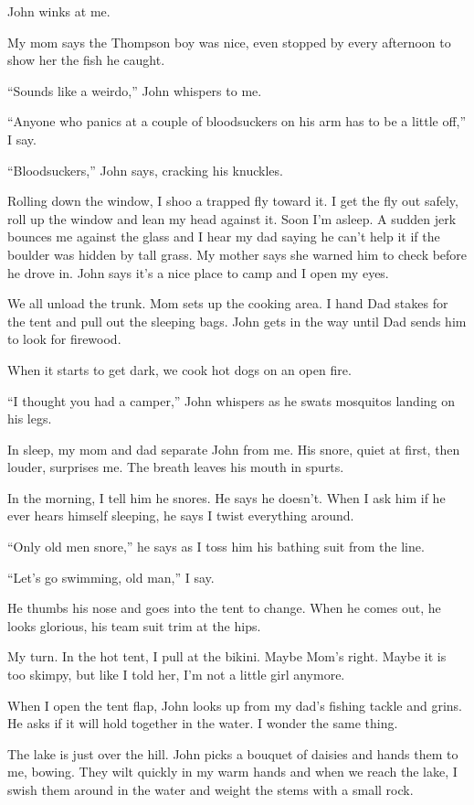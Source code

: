 \documentclass[
]{article}
\begin{document}
John winks at me.

My mom says the Thompson boy was nice, even stopped by every afternoon
to show her the fish he caught.

``Sounds like a weirdo,'' John whispers to me.

``Anyone who panics at a couple of bloodsuckers on his arm has to be a
little off,'' I say.

``Bloodsuckers,'' John says, cracking his knuckles.

Rolling down the window, I shoo a trapped fly toward it. I get the fly
out safely, roll up the win­dow and lean my head against it. Soon I'm
asleep. A sudden jerk bounces me against the glass and I hear my dad
saying he can't help it if the boulder was hidden by tall grass. My
mother says she warned him to check before he drove in. John says it's a
nice place to camp and I open my eyes.

We all unload the trunk. Mom sets up the cooking area. I hand Dad stakes
for the tent and pull out the sleeping bags. John gets in the way until
Dad sends him to look for firewood.

When it starts to get dark, we cook hot dogs on an open fire.

``I thought you had a camper,'' John whispers as he swats mosquitos
landing on his legs.

In sleep, my mom and dad separate John from me. His snore, quiet at
first, then louder, surprises me. The breath leaves his mouth in spurts.

In the morning, I tell him he snores. He says he doesn't. When I ask him
if he ever hears himself sleeping, he says I twist everything around.

``Only old men snore,'' he says as I toss him his bathing suit from the
line.

``Let's go swimming, old man,'' I say.

He thumbs his nose and goes into the tent to change. When he comes out,
he looks glorious, his team suit trim at the hips.

My turn. In the hot tent, I pull at the bikini. Maybe Mom's right. Maybe
it is too skimpy, but like I told her, I'm not a little girl anymore.

When I open the tent flap, John looks up from my dad's fishing tackle
and grins. He asks if it will hold together in the water. I wonder the
same thing.

The lake is just over the hill. John picks a bouquet of daisies and
hands them to me, bowing. They wilt quickly in my warm hands and when we
reach the lake, I swish them around in the water and weight the stems
with a small rock.
\end{document}
